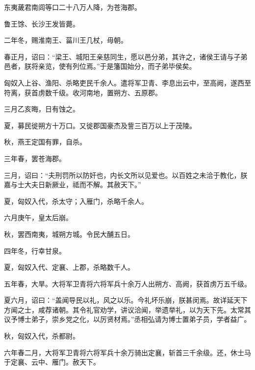 \documentclass[12pt,UTF8]{ctexbook}
\begin{document}
东夷薉君南闾等口二十八万人降，为苍海郡。



鲁王馀、长沙王发皆薨。



二年冬，赐淮南王、菑川王几杖，毋朝。



春正月，诏曰：“梁王、城阳王亲慈同生，愿以邑分弟，其许之，诸侯王请与子弟邑者，朕将亲览，使有列位焉。”于是籓国始分，而子弟毕侯矣。



匈奴入上谷、渔阳、杀略吏民千余人。遣将军卫青、李息出云中，至高阙，遂西至符离，获首虏数千级。收河南地，置朔方、五原郡。



三月乙亥晦，日有蚀之。



夏，募民徙朔方十万口。又徙郡国豪杰及訾三百万以上于茂陵。



秋，燕王定国有罪，自杀。



三年春，罢苍海郡。



三月，诏曰：“夫刑罚所以防奸也，内长文所以见爱也。以百姓之未洽于教化，朕嘉与士大夫日新厥业，祗而不解。其赦天下。”



夏，匈奴入代，杀太守；入雁门，杀略千余人。



六月庚午，皇太后崩。



秋，罢西南夷，城朔方城。令民大酺五日。



四年冬，行幸甘泉。



夏，匈奴入代、定襄、上郡，杀略数千人。



五年春，大旱。大将军卫青将六将军兵十余万人出朔方、高阙，获首虏万五千级。



夏六月，诏曰：“盖闻导民以礼，风之以乐。今礼坏乐崩，朕甚闵焉。故详延天下方闻之士，咸荐诸朝。其令礼官劝学，讲议洽闻，举遗举礼，以为天下先。太常其议予博士弟子，崇乡党之化，以厉贤材焉。”丞相弘请为博士置弟子员，学者益广。



秋，匈奴入代，杀都尉。



六年春二月，大将军卫青将六将军兵十余万骑出定襄，斩首三千余级。还，休士马于定襄、云中、雁门。赦天下。
\end{document}
